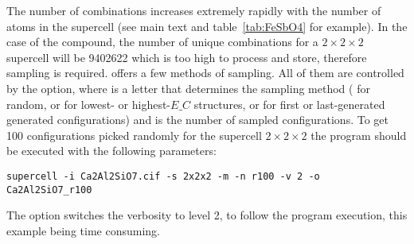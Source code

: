 \documentclass[a4paper,10pt]{article}
\begin{document}
The number of combinations increases extremely rapidly with the number of atoms in the supercell (see main text and table~\ref{tab:FeSbO4} for example). In the case of the  compound, the number of unique combinations for a $2\times2\times2$ supercell will be \num{9402622} which is too high to process and store, therefore sampling is required. \Sups{} offers a few methods of sampling. All of them are controlled by the  option, where  is a letter that determines the sampling method ( for random,  or  for lowest- or highest-$E\_C$ structures,  or  for first or last-generated generated configurations) and  is the number of sampled configurations. To get \num{100} configurations picked randomly for the supercell $2\times2\times2$ the program should be executed with the following parameters:
\begin{Verbatim}[breaklines]
supercell -i Ca2Al2SiO7.cif -s 2x2x2 -m -n r100 -v 2 -o Ca2Al2SiO7_r100
\end{Verbatim}
The option  switches the verbosity to level 2, to follow the program execution, this example being time consuming.
\end{document}

